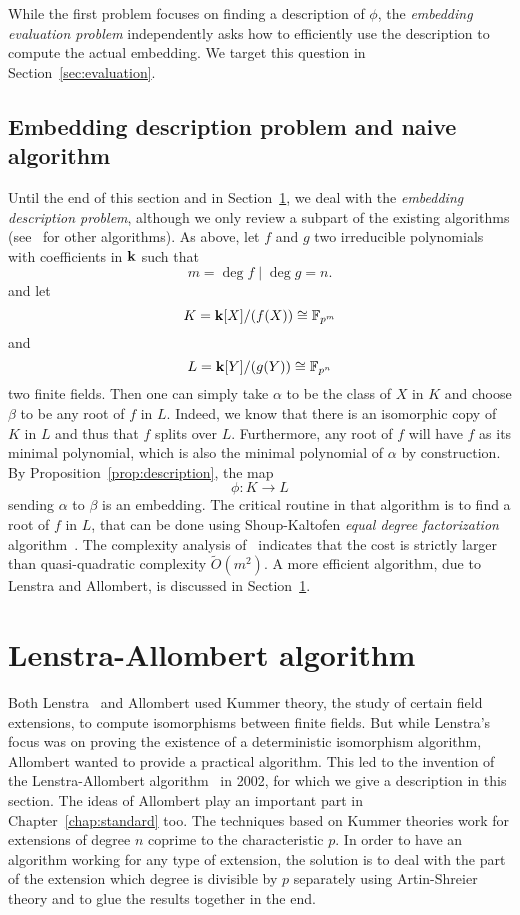 While the first problem focuses on finding a description of $\phi$, the
\emph{embedding evaluation problem} independently asks how to efficiently use
the description to compute the actual embedding. We target this question in
Section~\ref{sec:evaluation}.

\subsection{Embedding description problem and naive algorithm}

Until the end of this section and in Section~\ref{sec:allombert}, we deal with
the \emph{embedding description problem}, although we only review a subpart of
the existing algorithms (see~\cite{BDDFS17} for other algorithms). As above, let
$f$ and $g$ two irreducible polynomials with coefficients in $\mathbf{k}$ such that
\[
  m=\deg f\mid \deg g=n.
\]
and let
\[
  K=\mathbf{k}[X]/(f(X))\cong\mathbb{F}_{p^m}
\]
and
\[
  L = \mathbf{k}[Y]/(g(Y))\cong\mathbb{F}_{p^n}
\]
two finite fields. Then one can simply take $\alpha$ to be the class of $X$ in
$K$ and choose $\beta$ to be any root of $f$ in $L$. Indeed, we know that there
is an isomorphic copy of $K$ in $L$ and thus that $f$ splits over $L$.
Furthermore, any root of $f$ will have $f$ as its minimal polynomial, which is
also the minimal polynomial of $\alpha$ by construction. By
Proposition~\ref{prop:description}, the map 
\[
  \phi:K\to L
\]
sending $\alpha$ to $\beta$ is an embedding. The critical routine in that
algorithm is to find a root of $f$ in $L$, that can be done using Shoup-Kaltofen
\emph{equal degree factorization} algorithm~\cite{KS97}. The complexity analysis
of~\cite{BDDFS17} indicates that the cost is strictly larger than quasi-quadratic
complexity $\tilde O(m^2)$. A more efficient algorithm, due to Lenstra and
Allombert, is discussed in Section~\ref{sec:allombert}.

\section{Lenstra-Allombert algorithm}
\label{sec:allombert}

Both Lenstra~\cite{Lenstra91} and Allombert used
Kummer theory, the study of certain field extensions, to compute isomorphisms
between finite fields. But while Lenstra's focus
was on proving the existence of a deterministic isomorphism algorithm, Allombert 
wanted to provide a practical algorithm. This led to the invention of the
Lenstra-Allombert algorithm~\cite{Allombert02} in 2002, for which we give a
description in this section. The ideas of Allombert play an important part in
Chapter~\ref{chap:standard} too. The techniques based on Kummer theories work
for extensions of degree $n$ coprime to the characteristic $p$. In order to have
an algorithm working for any type of extension, the solution is to deal with the
part of the extension which degree is divisible by $p$ separately using
Artin-Shreier theory and to glue the results together in the end.

